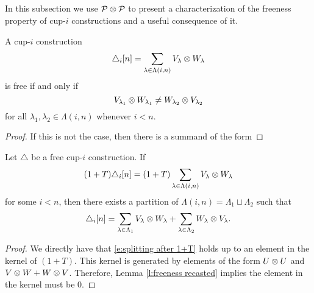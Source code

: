 \subsection{}

In this subsection we use $\mathcal{P} \otimes \mathcal{P}$ to present a characterization of the freeness property of cup-$i$ constructions and a useful consequence of it.

\begin{lemma} \label{l:freeness recasted}
	A cup-$i$ construction
	\[
	\triangle_i [n] = \sum_{\lambda \in \Lambda(i,n)} {V_\lambda} \otimes {W_\lambda}
	\]
	is free if and only if
	\[
	{V_{\lambda_1}} \otimes {W_{\lambda_1}} \neq
	{W_{\lambda_2}} \otimes {V_{\lambda_2}}
	\]
	for all $\lambda_1, \lambda_2 \in \Lambda(i,n)$ whenever $i < n$.
\end{lemma}

\begin{proof}
	If this is not the case, then there is a summand of the form
\end{proof}

\begin{lemma} \label{l:(1+T) triangle = 0 implies triangle = 0}
    Let $\triangle$ be a free cup-$i$ construction.
    If
    \[
    (1 + T) \triangle_i [n] =
    (1 + T) \sum_{\lambda \in \Lambda(i,n)} {V_\lambda} \otimes {W_\lambda}
    \]
    for some $i < n$, then there exists a partition of $\Lambda(i,n) = \Lambda_1 \sqcup \Lambda_2$ such that
    \begin{equation} \label{e:splitting after 1+T}
    \triangle_i [n] =
    \sum_{\lambda \in \Lambda_1} {V_\lambda} \otimes {W_\lambda} +
    \sum_{\lambda \in \Lambda_2} {W_\lambda} \otimes {V_\lambda}.
    \end{equation}
\end{lemma}

\begin{proof}
	We directly have that \eqref{e:splitting after 1+T} holds up to an element in the kernel of $(1+T)$.
	This kernel is generated by elements of the form $U \otimes U$ and $V \otimes W + W \otimes V$.
	Therefore, Lemma \ref{l:freeness recasted} implies the element in the kernel must be $0$.
\end{proof}